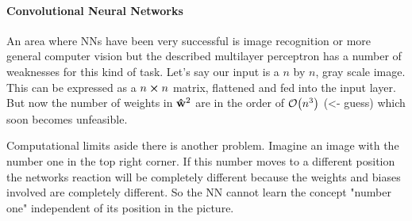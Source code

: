 \paragraph{Convolutional Neural Networks}
An area where NNs have been very successful is image recognition or more general computer vision but the described multilayer perceptron has a number of weaknesses for this kind of task. Let's say our input is a $n$ by $n$, gray scale image. This can be expressed as a $n \cp n$ matrix, flattened and fed into the input layer. But now the number of weights in $\vu{w}^2$ are in the order of
$\order{n^3}$ (<- guess)
which soon becomes unfeasible.

Computational limits aside there is another problem. Imagine an image with the number one in the top right corner. If this number moves to a different position the networks reaction will be completely different because the weights and biases involved are completely different. So the NN cannot learn the concept "number one" independent of its position in the picture.
